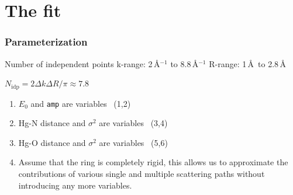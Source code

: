 \documentclass[10pt, xcolor=x11names, compress]{beamer}
\begin{document}
\section{The fit}

\begin{frame}
  \frametitle{Parameterization}

  \begin{center}
    \begin{minipage}{0.8\linewidth}
      \begin{block}{Number of independent points}
        k-range: 2\,\AA$^{-1}$ to 8.8\,\AA$^{-1}$ \hfill
        R-range: 1\,\AA\ to 2.8\,\AA \\[-2ex]
        \begin{center}
          $N_{\mathrm{idp}} = 2\Delta k\Delta R / \pi \approx 7.8$
        \end{center}
      \end{block}
    \end{minipage}

  \end{center}
  \begin{enumerate}
  \item $E_0$ and \texttt{amp} are variables \dotfill\ (1,2)
  \item Hg-N distance and $\sigma^2$ are variables \dotfill\ (3,4)
  \item Hg-O distance and $\sigma^2$ are variables \dotfill\ (5,6)
  \item Assume that the ring is \alert{completely rigid}, this allows
    us to approximate the contributions of various single and multiple
    scattering paths without introducing any more variables.
  \end{enumerate}



\end{frame}
\end{document}
